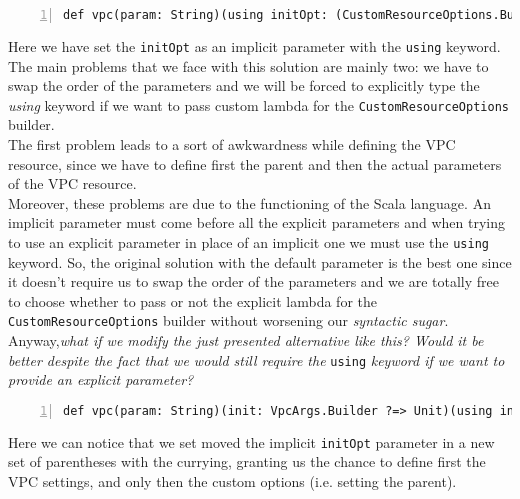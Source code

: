 \begin{minipage}{\linewidth}
\begin{lstlisting}[numbers=left, numberstyle=\tiny, numbersep=-5pt, stepnumber=1]
  def vpc(param: String)(using initOpt: (CustomResourceOptions.Builder ?=> Unit), init: VpcArgs.Builder ?=> Unit) : etc.
\end{lstlisting}
\end{minipage}
Here we have set the \texttt{initOpt} as an implicit parameter with the \texttt{using} keyword.
The main problems that we face with this solution are mainly two: we have to swap the order of the parameters and we will be forced to explicitly type the \textit{using} keyword if we want to pass custom lambda for the \texttt{CustomResourceOptions} builder.\\
The first problem leads to a sort of awkwardness while defining the VPC resource, since we have to define first the parent and then the actual parameters of the VPC resource.\\
Moreover, these problems are due to the functioning of the Scala language.
An implicit parameter must come before all the explicit parameters and when trying to use an explicit parameter in place of an implicit one we must use the \texttt{using} keyword.
So, the original solution with the default parameter is the best one since it doesn't require us to swap the order of the parameters and we are totally free to choose whether to pass or not the explicit lambda for the \texttt{CustomResourceOptions} builder without worsening our \textit{syntactic sugar}.\\
Anyway,\textit{what if we modify the just presented alternative like this? Would it be better despite the fact that we would still require the} \texttt{using} \textit{keyword if we want to provide an explicit parameter?}\\
\begin{minipage}{\linewidth}
  \begin{lstlisting}[numbers=left, numberstyle=\tiny, numbersep=-5pt, stepnumber=1]
    def vpc(param: String)(init: VpcArgs.Builder ?=> Unit)(using initOpt: CustomResourceOptions.Builder ?=> Unit) : etc.
  \end{lstlisting}
\end{minipage}
Here we can notice that we set moved the implicit \texttt{initOpt} parameter in a new set of parentheses with the currying, granting us the chance to define first the VPC settings, and only then the custom options (i.e. setting the parent).
